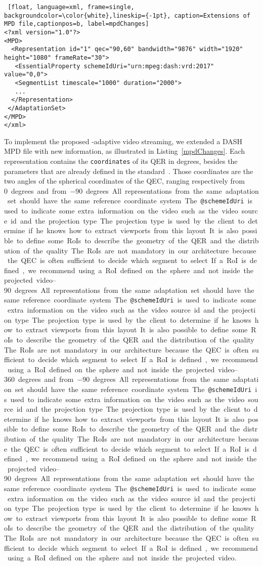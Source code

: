 \begin{lstlisting} [float, language=xml, frame=single, backgroundcolor=\color{white},lineskip={-1pt}, caption=Extensions of MPD file,captionpos=b, label=mpdChanges]
<?xml version="1.0"?>
<MPD>
  <Representation id="1" qec="90,60" bandwidth="9876" width="1920" height="1080" frameRate="30">
   <EssentialProperty schemeIdUri="urn:mpeg:dash:vrd:2017" value="0,0">
   <SegmentList timescale="1000" duration="2000">
   ...
  </Representation>
 </AdaptationSet>
</MPD>
</xml>
\end{lstlisting}

 To implement the proposed
\FoV{}-adaptive video streaming, we extended a \ac{DASH} \ac{MPD}
file with new information, as illustrated in Listing~\ref{mpdChanges}.
Each representation contains the \texttt{coordinates} of its \ac{QER}
in degrees, besides the parameters that are
already defined in the standard~\cite{iso_iec}.
Those coordinates are the two angles of the spherical coordinates of the \ac{QEC}, ranging respectively from \SIrange{0}{360} degrees and from \SIrange{-90}{90} degrees. All representations from the same adaptation set should have the same reference coordinate system.
The \texttt{@schemeIdUri} is used to indicate some extra information on the video such as the video source id and the projection type. The projection type is used by the client to determine if he knows how to extract viewports from this layout.
It is also possible to define some \acp{RoI} to describe the geometry of the \ac{QER} and the distribution of the quality.
The \acp{RoI} are not mandatory in our architecture because the \ac{QEC} is often sufficient to decide which segment to select.
If a \ac{RoI} is defined, we recommend using a \ac{RoI} defined on the sphere and not inside the projected video.

